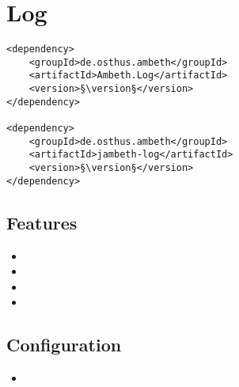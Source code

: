 \section{Log}
\label{module:Log}
\ClearAPI
\TODO
\begin{lstlisting}[style=POM,caption={Maven modules to use \emph{Ambeth Log}}]
<dependency>
	<groupId>de.osthus.ambeth</groupId>
	<artifactId>Ambeth.Log</artifactId>
	<version>§\version§</version>
</dependency>

<dependency>
	<groupId>de.osthus.ambeth</groupId>
	<artifactId>jambeth-log</artifactId>
	<version>§\version§</version>
</dependency>
\end{lstlisting}
\subsection{Features}
\begin{itemize}
	\item {}
	\item {}
	\item {}
	\item {}
\end{itemize}

\subsection{Configuration}
\begin{itemize}
	\item {}
\end{itemize}
